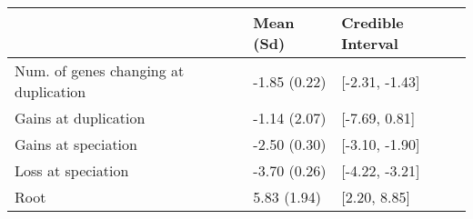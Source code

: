 
\begin{tabular}{lll}
\toprule
  & Mean (Sd) & Credible Interval\\
\midrule
Num. of genes changing at duplication & -1.85 (0.22) & {}[-2.31, -1.43]\\
Gains at duplication & -1.14 (2.07) & {}[-7.69, 0.81]\\
Gains at speciation & -2.50 (0.30) & {}[-3.10, -1.90]\\
Loss at speciation & -3.70 (0.26) & {}[-4.22, -3.21]\\
Root & 5.83 (1.94) & {}[2.20, 8.85]\\
\bottomrule
\end{tabular}
